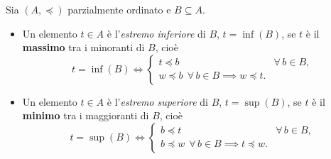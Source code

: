 \documentclass[11pt,a4paper]{article}
\begin{document}
\begin{definizione}
Sia $(A, \preceq)$ parzialmente ordinato e $B \subseteq A$.
\begin{itemize}
    \item Un elemento $t \in A$ è l'\emph{estremo inferiore} di $B$,
          $t = \inf(B)$, se $t$ è il \textbf{massimo} tra i minoranti di
          $B$, cioè
          \[
          t = \inf(B) \iff
          \begin{cases}
            t \preceq b & \forall\, b \in B, \\
            w \preceq b \ \ \forall\, b \in B \implies w \preceq t.
          \end{cases}
          \]
    \item Un elemento $t \in A$ è l'\emph{estremo superiore} di $B$,
          $t = \sup(B)$, se $t$ è il \textbf{minimo} tra i maggioranti di
          $B$, cioè
          \[
          t = \sup(B) \iff
          \begin{cases}
            b \preceq t & \forall\, b \in B, \\
            b \preceq w \ \ \forall\, b \in B \implies t \preceq w.
          \end{cases}
          \]
\end{itemize}
\end{definizione}
\end{document}
